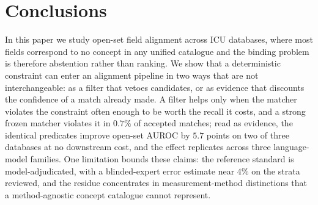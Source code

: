 \section{Conclusions}

In this paper we study open-set field alignment across ICU databases, where most fields
correspond to no concept in any unified catalogue and the binding problem is therefore
abstention rather than ranking. We show that a deterministic constraint can enter an
alignment pipeline in two ways that are not interchangeable: as a filter that vetoes
candidates, or as evidence that discounts the confidence of a match already made. A
filter helps only when the matcher violates the constraint often enough to be worth the
recall it costs, and a strong frozen matcher violates it in $0.7\%$ of accepted matches;
read as evidence, the identical predicates improve open-set AUROC by $5.7$ points on two
of three databases at no downstream cost, and the effect replicates across three
language-model families. One limitation bounds these claims: the reference standard is
model-adjudicated, with a blinded-expert error estimate near $4\%$ on the strata reviewed,
and the residue concentrates in measurement-method distinctions that a method-agnostic
concept catalogue cannot represent.

